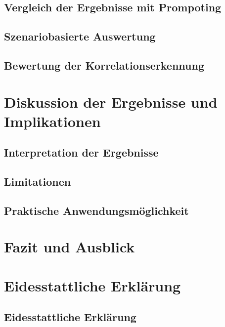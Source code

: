 \documentclass[
  11pt,
]{report}
\begin{document}
\section{Vergleich der Ergebnisse mit
Prompoting}\label{vergleich-der-ergebnisse-mit-prompoting}

\section{Szenariobasierte Auswertung}\label{szenariobasierte-auswertung}

\section{Bewertung der
Korrelationserkennung}\label{bewertung-der-korrelationserkennung}

\chapter{Diskussion der Ergebnisse und
Implikationen}\label{diskussion-der-ergebnisse-und-implikationen}

\section{Interpretation der
Ergebnisse}\label{interpretation-der-ergebnisse}

\section{Limitationen}\label{limitationen}

\section{Praktische
Anwendungsmöglichkeit}\label{praktische-anwendungsmuxf6glichkeit}

\chapter{Fazit und Ausblick}\label{fazit-und-ausblick}

\chapter{Eidesstattliche Erklärung}\label{eidesstattliche-erkluxe4rung}

\section*{Eidesstattliche Erklärung}
\end{document}
